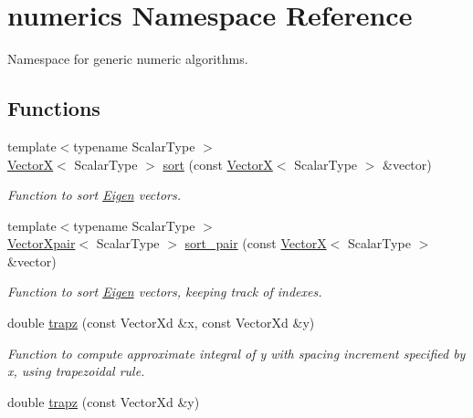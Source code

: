 \hypertarget{namespacenumerics}{\section{numerics Namespace Reference}
\label{namespacenumerics}
}


Namespace for generic numeric algorithms.  


\subsection*{Functions}
\begin{DoxyCompactItemize}
\item 
{\footnotesize template$<$typename Scalar\-Type $>$ }\\\hyperlink{typedefs_8h_ac264e7346c0c88c8a573518d1e8f8c3d}{Vector\-X}$<$ Scalar\-Type $>$ \hyperlink{namespacenumerics_a1633aabded7159bb15bbf573bf9e12c5}{sort} (const \hyperlink{typedefs_8h_ac264e7346c0c88c8a573518d1e8f8c3d}{Vector\-X}$<$ Scalar\-Type $>$ \&vector)
\begin{DoxyCompactList}\small\item\em Function to sort \hyperlink{index_Eigen}{Eigen} vectors. \end{DoxyCompactList}\item 
{\footnotesize template$<$typename Scalar\-Type $>$ }\\\hyperlink{typedefs_8h_a21ab9e8bc0dd8e3c178df27d98155cfa}{Vector\-Xpair}$<$ Scalar\-Type $>$ \hyperlink{namespacenumerics_a510fe73118ce8c79570ac87fa3e7df47}{sort\-\_\-pair} (const \hyperlink{typedefs_8h_ac264e7346c0c88c8a573518d1e8f8c3d}{Vector\-X}$<$ Scalar\-Type $>$ \&vector)
\begin{DoxyCompactList}\small\item\em Function to sort \hyperlink{index_Eigen}{Eigen} vectors, keeping track of indexes. \end{DoxyCompactList}\item 
double \hyperlink{namespacenumerics_a42e19b3ed2ac997af23b6cd39323c013}{trapz} (const Vector\-Xd \&x, const Vector\-Xd \&y)
\begin{DoxyCompactList}\small\item\em Function to compute approximate integral of {\itshape y} with spacing increment specified by {\itshape x}, using trapezoidal rule. \end{DoxyCompactList}\item 
double \hyperlink{namespacenumerics_a91e617ca6ea3fb6a16ff741ea31dc689}{trapz} (const Vector\-Xd \&y)

\end{DoxyCompactItemize}
